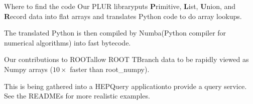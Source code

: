 \documentclass{beamer}
\begin{document}
\begin{frame}{Where to find the code}
Our PLUR library\footnotemark[1] puts {\bf P}rimitive, {\bf L}ist, {\bf U}nion, and {\bf R}ecord data into flat arrays and translates Python code to do array lookups.

\vspace{0.5 cm}
The translated Python is then compiled by Numba\footnotemark[2] (Python compiler for numerical algorithms) into fast bytecode.

\vspace{0.5 cm}
Our contributions to ROOT\footnotemark[3] allow ROOT TBranch data to be rapidly viewed as Numpy arrays ($10\times$ faster than root\_numpy).

\vspace{0.5 cm}
This is being gathered into a HEPQuery application\footnotemark[4] to provide a query service. See the READMEs for more realistic examples.

\end{frame}









\end{document}
